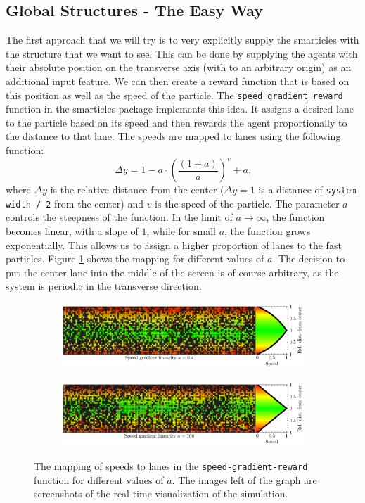 \subsection{Global Structures - The Easy Way}
\label{subsec:global_structure_easy}
The first approach that we will try is to very explicitly supply the smarticles with the structure that we want to see. This can be done by supplying the agents with their absolute position on the transverse axis (with to an arbitrary origin) as an additional input feature. We can then create a reward function that is based on this position as well as the speed of the particle. The \texttt{speed\_gradient\_reward} function in the smarticles package implements this idea. It assigns a desired lane to the particle based on its speed and then rewards the agent proportionally to the distance to that lane. The speeds are mapped to lanes using the following function:
\begin{equation}
    \Delta y=1-a\cdot\left(\frac{\left(1+a\right)}{a}\right)^{v}+a \text{,}
\end{equation}
where $\Delta y$ is the relative distance from the center ($\Delta y=1$ is a distance of \texttt{system width / 2} from the center) and $v$ is the speed of the particle. The parameter $a$ controls the steepness of the function. In the limit of $a\rightarrow\infty$, the function becomes linear, with a slope of $1$, while for small $a$, the function grows exponentially. This allows us to assign a higher proportion of lanes to the fast particles. Figure \ref{fig:speed_gradient} shows the mapping for different values of $a$. The decision to put the center lane into the middle of the screen is of course arbitrary, as the system is periodic in the transverse direction. 
\begin{figure}[H]
\centering
\begin{subfigure}{\textwidth}
    \centering
    \includegraphics[width=\textwidth]{speed_gradient_0.4}
\end{subfigure}
\begin{subfigure}{\textwidth}
    \centering
    \includegraphics[width=\textwidth]{speed_gradient_100}
\end{subfigure}
\caption{The mapping of speeds to lanes in the \texttt{speed-gradient-reward} function for different values of $a$. The images left of the graph are screenshots of the real-time visualization of the simulation.}
\label{fig:speed_gradient}
\end{figure}
